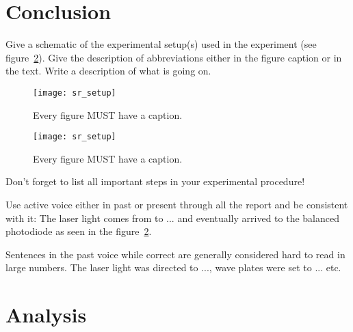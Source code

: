 \documentclass[letterpaper,12pt]{article}
\begin{document}
\section{Conclusion}

Give a schematic of the experimental setup(s) used in the experiment (see
figure~\ref{fig:samplesetup}). Give the description of  abbreviations
either in the figure caption or in the text. Write a description of what is
going on.

\begin{figure}[ht]
        \centering \texttt{[image: sr\_setup]}
        \caption{
                \label{fig:samplesetup}
                Every figure MUST have a caption.
                }
\end{figure}






\begin{figure}[ht]
        \centering \texttt{[image: sr\_setup]}
        \caption{
                \label{fig:samplesetup} %
                Every figure MUST have a caption.
        }
\end{figure}

Don't forget to list all important steps in your experimental procedure!

Use active voice either in past or present through all the report and be
consistent with it:
The laser light comes  from to ... and eventually arrived to the
balanced photodiode as seen in the figure~\ref{fig:samplesetup}.

Sentences in the past voice while correct are generally considered hard to read
in large numbers. The laser light was directed to ..., wave plates were set
to ... etc.


\section{Analysis}
\end{document}

